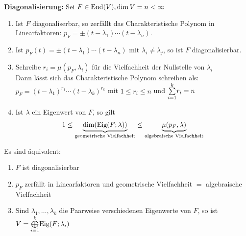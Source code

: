 \begin{mdframed}
\textbf{Diagonalisierung:} \quad Sei $F \in \text{End}(V), \dim V = n < \infty$
\begin{enumerate}[{(}a{)}]
    \vspace{-5pt}
    \item Ist $F$ diagonaliserbar, so zerfällt das Charakteristische Polynom in Linearfaktoren: $p_F = \pm (t - \lambda_1) \cdots (t - \lambda_n)$.
    \vspace{-5pt}
    \item Ist $p_F(t) = \pm (t - \lambda_1) \cdots (t - \lambda_n)$ mit $\lambda_i \neq \lambda_j$, so ist $F$ diagonalisierbar.
    \vspace{-5pt}
    \item Schreibe $r_i = \mu(p_F, \lambda_i)$ für die Vielfachheit der Nullstelle von $\lambda_i$\\
    Dann lässt sich das Charakteristische Polynom schreiben als: $p_F = (t - \lambda_1)^{r_1} \cdots (t - \lambda_k)^{r_k}$ mit $1 \leq r_i \leq n$ und $\underset{i = 1}{\overset{k}{\sum}}r_i = n$
    \vspace{-5pt}
    \item Ist $\lambda$ ein Eigenwert von $F$, so gilt
    \begin{align*}
        1 \leq \underbrace{\dim(\text{Eig}(F;\lambda))}_{\text{geometrische Vielfachheit}} \leq \underbrace{\mu(p_F, \lambda)}_{\text{algebraische Vielfachheit}}
    \end{align*}
\end{enumerate}
\vspace{-20pt}
Es sind äquivalent:
\begin{enumerate}[{(}i{)}]
    \item $F$ ist diagonalisierbar
    
    \vspace{-5pt}
    \item $p_F$ zerfällt in Linearfaktoren und geometrische Vielfachheit $=$ algebraische Vielfachheit
    
    \vspace{-5pt}
    \item Sind $\lambda_1, \ldots, \lambda_k$ die Paarweise verschiedenen Eigenwerte von $F$, so ist $V = \underset{i = 1}{\overset{k}{\bigoplus}} \text{Eig}(F;\lambda_i)$
\end{enumerate}
\end{mdframed}
